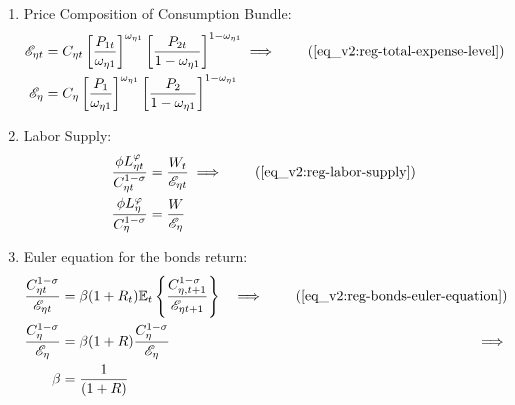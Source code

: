 \documentclass[../thesis.tex]{subfiles}
\begin{document}
\begin{enumerate}
\begin{comment}
	\item Regional Consumption of good 1:
\begin{align}
	C_{\eta 1 t} &= \te \frac{\omega_{\eta 1}}{P_{1 t}} \implies \tag{\ref{eq_v2:reg-Cn-Cn-2}} \\
	C_{\eta 1} &= \te[] \frac{\omega_{\eta 1}}{P_{1}} \label{eq_v2:reg-ss-C1-Cn-2}
\end{align}

\item Regional Consumption of good 2:
\begin{align}
	C_{\eta 2 t} &= \te \frac{1 -\omega_{\eta 1}}{P_{2 t}} \implies \tag{\ref{eq_v2:reg-Cn-Cv-2}} \\
	C_{\eta 2} &= \te[] \frac{1 -\omega_{\eta 1}}{P_{2}} \label{eq_v2:reg-ss-C2-Cn-2}
\end{align}

	
\end{comment}

	\item Price Composition of Consumption Bundle:
	\begin{align}
		\te &= C_{\eta t} \left[ \frac{P_{1 t}}{\omega_{\eta 1}} \right]^{\omega_{\eta 1}} \left[ \frac{P_{2 t}}{1 -\omega_{\eta 1}} \right]^{1 -\omega_{\eta 1}} \implies \tag{\ref{eq_v2:reg-total-expense-level}} 
		\\
		\te[] &= C_{\eta} \left[ \frac{P_{1}}{\omega_{\eta 1}} \right]^{\omega_{\eta 1}} \left[ \frac{P_{2}}{1 -\omega_{\eta 1}} \right]^{1 -\omega_{\eta 1}} \label{eq_v2:reg-ss-price-eta-level}
	\end{align}

	\item Labor Supply:
	\begin{align}
		\frac{\phi L_{\eta t}^{\varphi}}{C_{\eta t}^{1-\sigma}} &= \frac{W_t}{\te} \implies \tag{\ref{eq_v2:reg-labor-supply}} \\
		\frac{\phi L_{\eta}^{\varphi}}{C_{\eta}^{1-\sigma}} &= \frac{W}{\te[]} \label{eq_v2:reg-ss-household-labor-supply}
	\end{align}

	\item Euler equation for the bonds return:
	\begin{alignat}{2}
		\frac{ C_{\eta t}^{1-\sigma}}{ \te} &= \beta (1 + R_{t}) \E \left\{ \frac{ C_{\eta, t+1}^{1-\sigma}}{ \te[t+1]} \right\} &\implies \tag{\ref{eq_v2:reg-bonds-euler-equation}} 
		\\
		\frac{ C_{\eta}^{1-\sigma}}{ \te[]} &= \beta (1 + R) \frac{ C_{\eta}^{1-\sigma}}{ \te[]} &\implies \nonumber 
		\\
		\beta &= \frac{1}{(1 + R)} \label{eq_v2:reg-ss-bonds-euler-equation}
	\end{alignat}


\end{enumerate}
\end{document}
